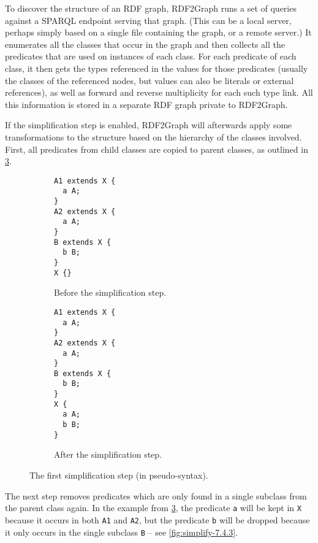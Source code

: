 To discover the structure of an RDF graph,
RDF2Graph runs a set of queries against a SPARQL endpoint serving that graph.
(This can be a local server, perhaps simply based on a single file containing the graph,
or a remote server.)
It enumerates all the classes that occur in the graph
and then collects all the predicates that are used on instances of each class.
For each predicate of each class,
it then gets the types referenced in the values for those predicates
(usually the classes of the referenced nodes,
but values can also be literals or external references),
as well as forward and reverse multiplicity for each such type link.
All this information is stored in a separate RDF graph private to RDF2Graph.

If the simplification step is enabled,
RDF2Graph will afterwards apply some transformations to the structure
based on the hierarchy of the classes involved.
First, all predicates from child classes are copied to parent classes,
as outlined in \cref{fig:simplify-7.4.2}.

\begin{figure}[h]
  \begin{subfigure}[t]{0.45\textwidth}
    \begin{lstlisting}
A1 extends X {
  a A;
}
A2 extends X {
  a A;
}
B extends X {
  b B;
}
X {}
    \end{lstlisting}
    \caption{Before the simplification step.}
    \label{fig:simplify-7.4.2-before}
  \end{subfigure}
  \begin{subfigure}[t]{0.45\textwidth}
    \begin{lstlisting}
A1 extends X {
  a A;
}
A2 extends X {
  a A;
}
B extends X {
  b B;
}
X {
  a A;
  b B;
}
    \end{lstlisting}
    \caption{After the simplification step.}
    \label{fig:simplify-7.4.2-after}
  \end{subfigure}
  \caption{The first simplification step (in pseudo-syntax).}
  \label{fig:simplify-7.4.2}
\end{figure}

The next step removes predicates which are only found in a single subclass
from the parent class again.
In the example from \cref{fig:simplify-7.4.2},
the predicate \lstinline{a} will be kept in \lstinline{X}
because it occurs in both \lstinline{A1} and \lstinline{A2},
but the predicate \lstinline{b} will be dropped
because it only occurs in the single subclass \lstinline{B} –
see \cref{fig:simplify-7.4.3}.

